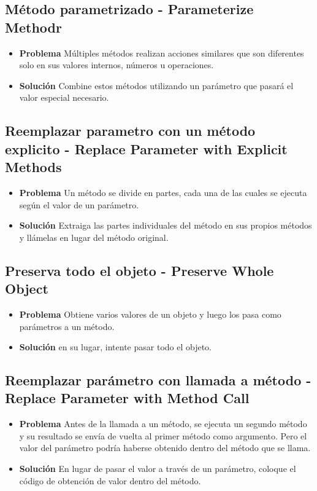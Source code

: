\documentclass[11pt,a4paper,oneside]{book}
\begin{document}
\subsection{Método parametrizado - Parameterize Methodr}
\label{parameterizemethod}
\begin{itemize}
    \item \textbf{Problema} Múltiples métodos realizan acciones similares que son diferentes solo en sus valores internos, números u operaciones.
    \item \textbf{Solución} Combine estos métodos utilizando un parámetro que pasará el valor especial necesario.
\end{itemize}

\subsection{Reemplazar parametro con un método explicito - Replace Parameter with Explicit Methods}
\label{replaceparameterwithexplicitmethods}
\begin{itemize}
    \item \textbf{Problema} Un método se divide en partes, cada una de las cuales se ejecuta según el valor de un parámetro.
    \item \textbf{Solución} Extraiga las partes individuales del método en sus propios métodos y llámelas en lugar del método original.
\end{itemize}

\subsection{Preserva todo el objeto - Preserve Whole Object}
\label{preservewholeobject}
\begin{itemize}
    \item \textbf{Problema} Obtiene varios valores de un objeto y luego los pasa como parámetros a un método.
    \item \textbf{Solución} en su lugar, intente pasar todo el objeto.
\end{itemize}
    


\subsection{Reemplazar parámetro con llamada a método - Replace Parameter with Method Call}
\label{replaceparameterwithmethodcall}
\begin{itemize}
    \item \textbf{Problema} Antes de la llamada a un método, se ejecuta un segundo método y su resultado se envía de vuelta al primer método como argumento. Pero el valor del parámetro podría haberse obtenido dentro del método que se llama.
    \item \textbf{Solución} En lugar de pasar el valor a través de un parámetro, coloque el código de obtención de valor dentro del método.
\end{itemize}
\end{document}
